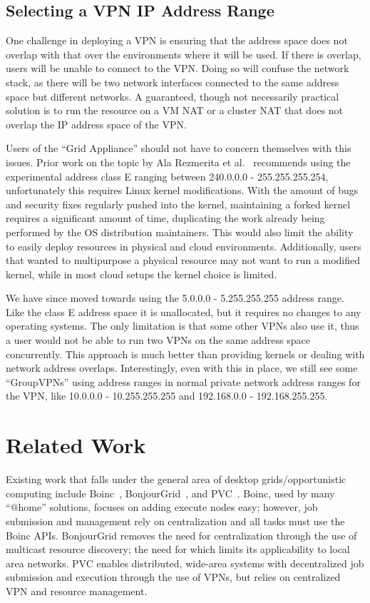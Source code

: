 \documentclass[conference]{IEEEtran}
\begin{document}
\subsection{Selecting a VPN IP Address Range}

One challenge in deploying a VPN is ensuring that the address space does not
overlap with that over the environments where it will be used.  If there is
overlap, users will be unable to connect to the VPN.  Doing so will confuse the
network stack, as there will be two network interfaces connected to the same
address space but different networks.  A guaranteed, though not necessarily
practical solution is to run the resource on a VM NAT or a cluster NAT that
does not overlap the IP address space of the VPN.

Users of the ``Grid Appliance'' should not have to concern themselves with this
issues.  Prior work on the topic by Ala Rezmerita et al.~\cite{pvc} recommends
using the experimental address class E ranging between 240.0.0.0 -
255.255.255.254, unfortunately this requires Linux kernel modifications.  With
the amount of bugs and security fixes regularly pushed into the kernel,
maintaining a forked kernel requires a significant amount of time, duplicating
the work already being performed by the OS distribution maintainers.  This
would also limit the ability to easily deploy resources in physical and cloud
environments.  Additionally, users that wanted to multipurpose a physical
resource may not want to run a modified kernel, while in most cloud setups the
kernel choice is limited.

We have since moved towards using the 5.0.0.0 - 5.255.255.255 address range.
Like the class E address space it is unallocated, but it requires no changes to
any operating systems.  The only limitation is that some other VPNs also use
it, thus a user would not be able to run two VPNs on the same address space
concurrently.  This approach is much better than providing kernels or dealing
with network address overlaps.  Interestingly, even with this in place, we
still see some ``GroupVPNs''  using address ranges in normal private network
address ranges for the VPN, like 10.0.0.0 - 10.255.255.255 and 192.168.0.0 -
192.168.255.255.

\section{Related Work}
\label{related_work}

Existing work that falls under the general area of desktop grids/opportunistic
computing include Boinc~\cite{boinc}, BonjourGrid~\cite{bonjourgrid}, and
PVC~\cite{pvc}.  Boinc, used by many ``@home'' solutions, focuses on adding
execute nodes easy; however, job submission and management rely on
centralization and all tasks must use the Boinc APIs.  BonjourGrid removes the
need for centralization through the use of multicast resource discovery; the
need for which limits its applicability to local area networks.  PVC enables
distributed, wide-area systems with decentralized job submission and execution
through the use of VPNs, but relies on centralized VPN and resource management.
\end{document}
